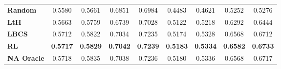\begin{tabular}{lcccc|cccc}
 \midrule
\textbf{Random } & {0.5580} & 0.5661 & 0.6851 & 0.6984 & 0.4483 & 0.4621 & 0.5252 & 0.5276 \\
\textbf{LtH } & {0.5663} & 0.5759 & {0.6739} & {0.7028} & 0.5122 & 0.5218 & 0.6292 & 0.6444 \\
\textbf{LBCS } & {0.5712} & {0.5822} & {0.7034} & 0.7235 & 0.5174 & 0.5328 & 0.6568 & 0.6712 \\
\textbf{RL } & \textbf{0.5717} & \textbf{0.5829} & \textbf{0.7042} & \textbf{0.7239} & \textbf{0.5183} & \textbf{0.5334} & \textbf{0.6582} & \textbf{0.6733} \\
\midrule
\textbf{NA Oracle } & 0.5718 & 0.5835 & 0.7038 & 0.7236 & 0.5180 & 0.5336 & 0.6568 & 0.6717\\
\bottomrule
\end{tabular}